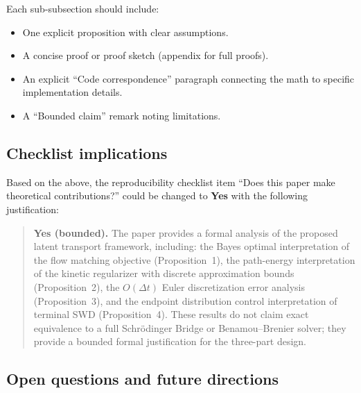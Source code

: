 \documentclass[letterpaper]{article}
\begin{document}
Each sub-subsection should include:
\begin{itemize}
    \item One explicit proposition with clear assumptions.
    \item A concise proof or proof sketch (appendix for full proofs).
    \item An explicit ``Code correspondence'' paragraph connecting the math
    to specific implementation details.
    \item A ``Bounded claim'' remark noting limitations.
\end{itemize}

\subsection{Checklist implications}

Based on the above, the reproducibility checklist item
``Does this paper make theoretical contributions?'' could be changed to
\textbf{Yes} with the following justification:

\begin{quote}
\textbf{Yes (bounded).} The paper provides a formal analysis of the proposed
latent transport framework, including: the Bayes optimal interpretation of
the flow matching objective (Proposition~1), the path-energy interpretation
of the kinetic regularizer with discrete approximation bounds (Proposition~2),
the $O(\Delta t)$ Euler discretization error analysis (Proposition~3),
and the endpoint distribution control interpretation of terminal SWD
(Proposition~4). These results do not claim exact equivalence to a full
Schr\"odinger Bridge or Benamou--Brenier solver; they provide a bounded
formal justification for the three-part design.
\end{quote}

\subsection{Open questions and future directions}
\end{document}
